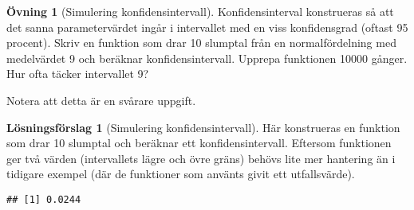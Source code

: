 \documentclass[
]{book}
\newenvironment{Shaded}{\begin{snugshade}}{\end{snugshade}}
\newcommand{\AttributeTok}[1]{\textcolor[rgb]{0.77,0.63,0.00}{#1}}
\newcommand{\CommentTok}[1]{\textcolor[rgb]{0.56,0.35,0.01}{\textit{#1}}}
\newcommand{\ControlFlowTok}[1]{\textcolor[rgb]{0.13,0.29,0.53}{\textbf{#1}}}
\newcommand{\DecValTok}[1]{\textcolor[rgb]{0.00,0.00,0.81}{#1}}
\newcommand{\FunctionTok}[1]{\textcolor[rgb]{0.00,0.00,0.00}{#1}}
\newcommand{\NormalTok}[1]{#1}
\newcommand{\OtherTok}[1]{\textcolor[rgb]{0.56,0.35,0.01}{#1}}
\newcommand{\SpecialCharTok}[1]{\textcolor[rgb]{0.00,0.00,0.00}{#1}}
\newcommand{\StringTok}[1]{\textcolor[rgb]{0.31,0.60,0.02}{#1}}
\theoremstyle{definition}
\theoremstyle{definition}
\theoremstyle{definition}
\newtheorem{exercise}{Övning}[chapter]
\theoremstyle{definition}
\newtheorem{hypothesis}{Lösningsförslag}[chapter]
\theoremstyle{remark}
\begin{document}
\begin{exercise}[Simulering konfidensintervall]
Konfidensinterval konstrueras så att det sanna parametervärdet ingår i intervallet med en viss konfidensgrad (oftast 95 procent). Skriv en funktion som drar 10 slumptal från en normalfördelning med medelvärdet 9 och beräknar konfidensintervall. Upprepa funktionen 10000 gånger. Hur ofta täcker intervallet 9?

Notera att detta är en svårare uppgift.
\end{exercise}

\begin{hypothesis}[Simulering konfidensintervall]
Här konstrueras en funktion som drar 10 slumptal och beräknar ett konfidensintervall. Eftersom funktionen ger två värden (intervallets lägre och övre gräns) behövs lite mer hantering än i tidigare exempel (där de funktioner som använts givit ett utfallsvärde).

\begin{Shaded}
\end{Shaded}

\begin{verbatim}
## [1] 0.0244
\end{verbatim}

\begin{Shaded}
\end{Shaded}


\end{hypothesis}
\end{document}
